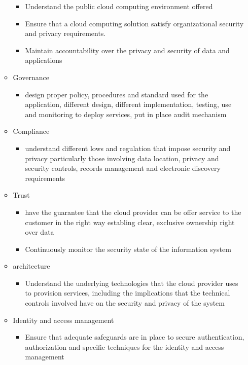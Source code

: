 \documentclass{article}
\begin{document}
\begin{itemize}
\begin{itemize}
\begin{itemize}
            \item Understand the public cloud computing environment offered
            \item Ensure that a cloud computing solution satisfy organizational security and privacy requirements.
            \item Maintain accountability over the privacy and security of data and applications
        \end{itemize}
        \item Governance
        \begin{itemize}
            \item design proper policy, procedures and standard used for the application, different design, different implementation, testing, use and monitoring to deploy services, put in place audit mechanism
        \end{itemize}
        \item Compliance
        \begin{itemize}
            \item understand different lows and regulation that impose security and privacy particularly those involving data location, privacy and security controls, records management and electronic discovery requirements
        \end{itemize}
        \item Trust
        \begin{itemize}
            \item have the guarantee that the cloud provider can be offer service to the customer in the right way establing clear, exclusive ownership right over data
            \item Continuously monitor the security state of the information system
        \end{itemize}
        \item architecture
        \begin{itemize}
            \item Understand the underlying technologies that the cloud provider uses to provision services, including the implications that the technical controls involved have on the security and privacy of the system
        \end{itemize}
        \item Identity and access management
        \begin{itemize}
            \item Ensure that adequate safeguards are in place to secure authentication, authorization and specific techniques for the identity and access management

\end{itemize}
\end{itemize}
\end{itemize}
\end{document}
